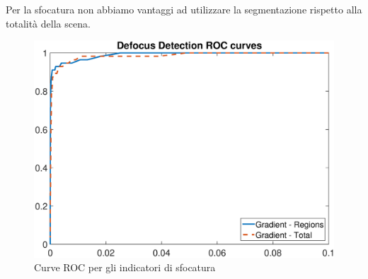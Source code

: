 Per la sfocatura non abbiamo vantaggi ad utilizzare la segmentazione rispetto alla totalit\`a della scena.\\ 
\begin{figure}[tb]
\centering
\includegraphics[width=13cm]{diagrammi/ROC_defocus}
\caption{Curve ROC per gli indicatori di sfocatura}
\label{fig:ROC_defocus}
\end{figure}
